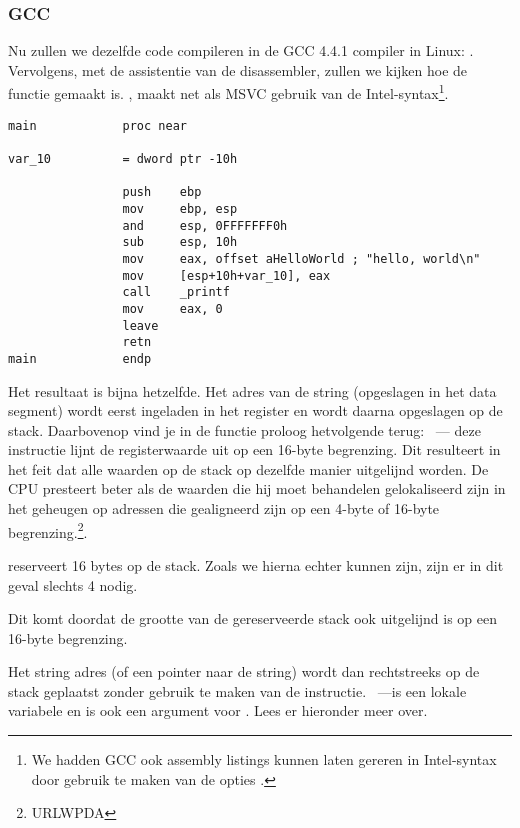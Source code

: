 \subsubsection{GCC}

Nu zullen we dezelfde \CCpp code compileren in de GCC 4.4.1 compiler in Linux: .
Vervolgens, met de assistentie van de \IDA disassembler, zullen we kijken hoe de \main functie gemaakt is.
\IDA, maakt net als MSVC gebruik van de Intel-syntax\footnote{We hadden GCC ook assembly listings kunnen laten gereren in Intel-syntax door gebruik te maken van de opties .}.

\begin{lstlisting}[caption=code in \IDA,style=customasm]
main            proc near

var_10          = dword ptr -10h

                push    ebp
                mov     ebp, esp
                and     esp, 0FFFFFFF0h
                sub     esp, 10h
                mov     eax, offset aHelloWorld ; "hello, world\n"
                mov     [esp+10h+var_10], eax
                call    _printf
                mov     eax, 0
                leave
                retn
main            endp
\end{lstlisting}

Het resultaat is bijna hetzelfde.
Het adres van de  string (opgeslagen in het data segment) wordt eerst ingeladen in het \EAX register en wordt daarna opgeslagen op de stack.
Daarbovenop vind je in de functie proloog hetvolgende terug: ~---
deze instructie lijnt de \ESP registerwaarde uit op een 16-byte begrenzing.
Dit resulteert in het feit dat alle waarden op de stack op dezelfde manier uitgelijnd worden.
De CPU presteert beter als de waarden die hij moet behandelen gelokaliseerd zijn in het geheugen op adressen die gealigneerd zijn op een 4-byte of 16-byte begrenzing.\footnote{URLWPDA}.

 reserveert 16 bytes op de stack. Zoals we hierna echter kunnen zijn, zijn er in dit geval slechts 4 nodig.

Dit komt doordat de grootte van de gereserveerde stack ook uitgelijnd is op een 16-byte begrenzing.

Het string adres (of een pointer naar de string) wordt dan rechtstreeks op de stack geplaatst zonder gebruik te maken van de \PUSH instructie.
~---is een lokale variabele en is ook een argument voor \printf{}.
Lees er hieronder meer over.

